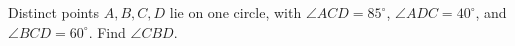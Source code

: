 Distinct points $A,B,C,D$ lie on one circle, with $\angle ACD=85^\circ$, $\angle ADC=40^\circ$, and $\angle BCD=60^\circ$. Find $\angle CBD$.
